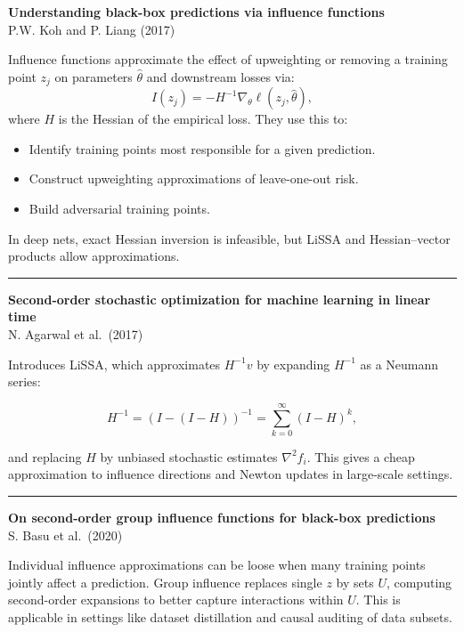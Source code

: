 \documentclass[a5paper]{article}
\providecommand{\tightlist}{%
  \setlength{\itemsep}{0pt}\setlength{\parskip}{0pt}}
\begin{document}
\textbf{Understanding black-box predictions via influence functions}\\
P.W. Koh and P. Liang (2017)

Influence functions approximate the effect of upweighting or removing a
training point $z_j$ on parameters $\hat\theta$ and downstream losses via:
\[ I(z_j) =
-H^{-1}\nabla_\theta \ell(z_j,\hat\theta), \]
where $H$ is the Hessian of the empirical loss. They use this to:

\begin{itemize}
\tightlist
\item
  Identify training points most responsible for a given prediction.
\item
  Construct upweighting approximations of leave-one-out risk.
\item
  Build adversarial training points.
\end{itemize}

In deep nets, exact Hessian inversion is infeasible, but LiSSA and
Hessian--vector products allow approximations.

\begin{center}\rule{0.5\linewidth}{0.5pt}\end{center}

\textbf{Second-order stochastic optimization for machine learning in
linear time}\\
N. Agarwal et al.~(2017)

Introduces LiSSA, which approximates $H^{-1}v$ by expanding $H^{-1}$ as a Neumann
series:

\[ H^{-1} = (I - (I-H))^{-1} =
\sum_{k=0}^\infty (I-H)^k, \]

and replacing $H$ by unbiased stochastic estimates $\nabla^2 f_i$.
This gives a cheap approximation to influence directions and Newton
updates in large-scale settings.

\begin{center}\rule{0.5\linewidth}{0.5pt}\end{center}

\textbf{On second-order group influence functions for black-box
predictions}\\
S. Basu et al.~(2020)

Individual influence approximations can be loose when many training
points jointly affect a prediction. Group influence replaces single $z$ by
sets $U$, computing second-order expansions to better capture interactions
within $U$. This is applicable in settings like dataset distillation and
causal auditing of data subsets.
\end{document}
